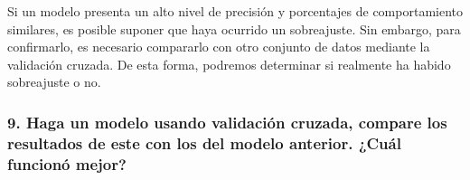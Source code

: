 \documentclass[
]{article}
\newenvironment{Shaded}{\begin{snugshade}}{\end{snugshade}}
\newcommand{\AttributeTok}[1]{\textcolor[rgb]{0.77,0.63,0.00}{#1}}
\newcommand{\CommentTok}[1]{\textcolor[rgb]{0.56,0.35,0.01}{\textit{#1}}}
\newcommand{\ConstantTok}[1]{\textcolor[rgb]{0.00,0.00,0.00}{#1}}
\newcommand{\DecValTok}[1]{\textcolor[rgb]{0.00,0.00,0.81}{#1}}
\newcommand{\FloatTok}[1]{\textcolor[rgb]{0.00,0.00,0.81}{#1}}
\newcommand{\FunctionTok}[1]{\textcolor[rgb]{0.00,0.00,0.00}{#1}}
\newcommand{\NormalTok}[1]{#1}
\newcommand{\OtherTok}[1]{\textcolor[rgb]{0.56,0.35,0.01}{#1}}
\newcommand{\SpecialCharTok}[1]{\textcolor[rgb]{0.00,0.00,0.00}{#1}}
\newcommand{\StringTok}[1]{\textcolor[rgb]{0.31,0.60,0.02}{#1}}
\begin{document}
Si un modelo presenta un alto nivel de precisión y porcentajes de
comportamiento similares, es posible suponer que haya ocurrido un
sobreajuste. Sin embargo, para confirmarlo, es necesario compararlo con
otro conjunto de datos mediante la validación cruzada. De esta forma,
podremos determinar si realmente ha habido sobreajuste o no.

\hypertarget{haga-un-modelo-usando-validaciuxf3n-cruzada-compare-los-resultados-de-este-con-los-del-modelo-anterior.-cuuxe1l-funcionuxf3-mejor}{%
\subsubsection{9. Haga un modelo usando validación cruzada, compare los
resultados de este con los del modelo anterior. ¿Cuál funcionó
mejor?}\label{haga-un-modelo-usando-validaciuxf3n-cruzada-compare-los-resultados-de-este-con-los-del-modelo-anterior.-cuuxe1l-funcionuxf3-mejor}}

\begin{Shaded}
\end{Shaded}
\end{document}
